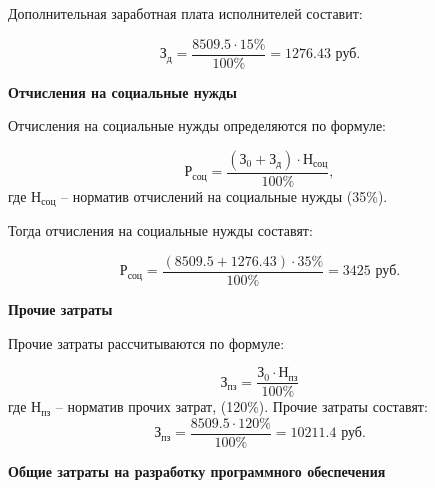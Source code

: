 Дополнительная заработная плата исполнителей составит:

\begin{equation*}
    \textit{З}_\textit{д} = \frac{8509.5 \cdot 15\%}{100\%} = 1276.43 \textrm{ руб.}
\end{equation*}

\bigskip
\textbf{Отчисления на социальные нужды}

Отчисления на социальные нужды определяются по формуле:

\begin{equation}
    \textit{Р}_\textit{соц} = \frac{(\textit{З}_0 + \textit{З}_\textit{д}) \cdot \textit{Н}_\textit{соц}}{100\%},
\end{equation}
где $\textit{Н}_\textit{соц}$ – норматив отчислений на социальные нужды (35\%). 

Тогда отчисления на социальные нужды составят:

\begin{equation*}
    \textit{Р}_\textit{соц} = \frac{(8509.5 + 1276.43) \cdot 35\%}{100\%} = 3425 \textrm{ руб.}
\end{equation*}

\bigskip
\textbf{Прочие затраты}

Прочие затраты рассчитываются по формуле:

\begin{equation}
    \textit{З}_\textit{пз} = \frac{\textit{З}_0 \cdot \textit{Н}_\textit{пз}}{100\%}
\end{equation}
где $\textit{Н}_\textit{пз}$ – норматив прочих затрат, (120\%).
Прочие затраты составят:
\begin{equation*}
    \textit{З}_\textit{пз} = \frac{8509.5 \cdot 120\%}{100\%} = 10211.4 \textrm{ руб.}
\end{equation*}

\bigskip
\textbf{Общие затраты на разработку программного обеспечения}

